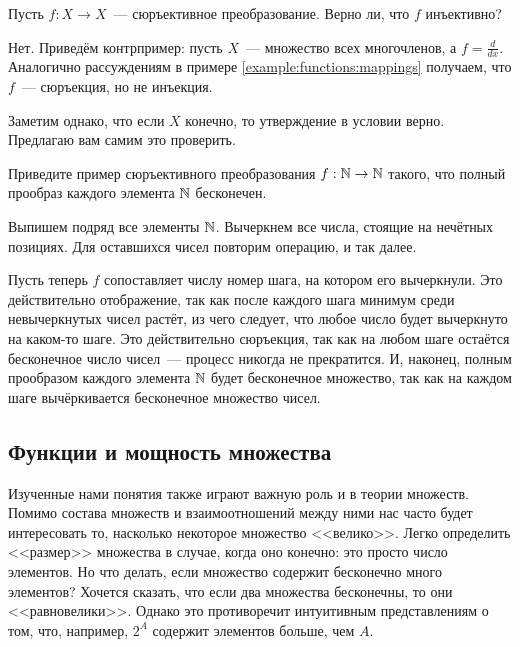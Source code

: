 \begin{Exercise}[counter=SecExercise]
    \noindent
    Пусть $ f: X \to X $~--- сюръективное преобразование.
    Верно ли, что $ f $ инъективно?
\end{Exercise}

\begin{Answer}
    \noindent
    Нет.
    Приведём контрпример: пусть $ X $~--- множество всех многочленов, а $ f = \frac{d}{dx} $.
    Аналогично рассуждениям в примере \ref{example:functions:mappings} получаем, что $ f $~--- сюръекция, но не инъекция.

    Заметим однако, что если $ X $ конечно, то утверждение в условии верно.
    Предлагаю вам самим это проверить.
\end{Answer}

\begin{Exercise}[counter=SecExercise]
    \noindent
    Приведите пример сюръективного преобразования $ f: \mathbb{N} \to \mathbb{N} $ такого, что полный прообраз каждого элемента $ \mathbb{N} $ бесконечен.
\end{Exercise}

\begin{Answer}
    \noindent
    Выпишем подряд все элементы $ \mathbb{N} $.
    Вычеркнем все числа, стоящие на нечётных позициях.
    Для оставшихся чисел повторим операцию, и так далее.

    Пусть теперь $ f $ сопоставляет числу номер шага, на котором его вычеркнули.
    Это действительно отображение, так как после каждого шага минимум среди невычеркнутых чисел растёт, из чего следует, что любое число будет вычеркнуто на каком-то шаге.
    Это действительно сюръекция, так как на любом шаге остаётся бесконечное число чисел~--- процесс никогда не прекратится.
    И, наконец, полным прообразом каждого элемента $ \mathbb{N} $ будет бесконечное множество, так как на каждом шаге вычёркивается бесконечное множество чисел.
\end{Answer}


\subsection{Функции и мощность множества}
\label{subsec:functions:cardinality}

Изученные нами понятия также играют важную роль и в теории множеств.
Помимо состава множеств и взаимоотношений между ними нас часто будет интересовать то, насколько некоторое множество <<велико>>.
Легко определить <<размер>> множества в случае, когда оно конечно: это просто число элементов.
Но что делать, если множество содержит бесконечно много элементов?
Хочется сказать, что если два множества бесконечны, то они <<равновелики>>.
Однако это противоречит интуитивным представлениям о том, что, например, $ 2^A $ содержит элементов больше, чем $ A $.

